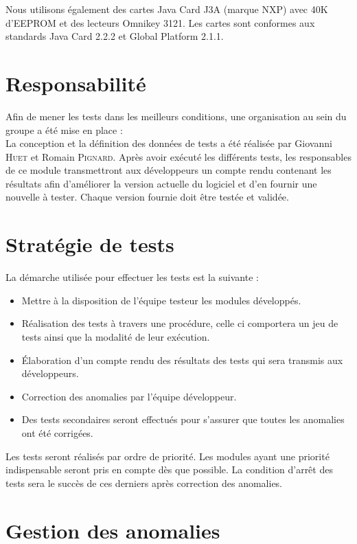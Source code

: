 \documentclass[a4paper,11pt,french]{article}
\begin{document}
Nous utilisons également des cartes Java Card J3A (marque NXP) avec 40K
d'EEPROM et des lecteurs Omnikey 3121. Les cartes sont conformes aux standards
Java Card 2.2.2 et Global Platform 2.1.1.

\section{Responsabilité}
Afin de mener les tests dans les meilleurs conditions, une organisation au sein
du groupe a été mise en place :\\

La conception et la définition des données de tests a été réalisée par
Giovanni \textsc{Huet} et Romain \textsc{Pignard}. Après avoir exécuté
les différents tests, les responsables de ce module transmettront aux
développeurs un compte rendu contenant les résultats afin d’améliorer la
version actuelle du logiciel et d'en fournir une nouvelle à tester. Chaque
version fournie doit être testée et validée.

\section{Stratégie de tests}

La démarche utilisée pour effectuer les tests est la suivante :
\begin{itemize}
\item Mettre à la disposition de l’équipe testeur les modules développés.
\item Réalisation des tests à travers une procédure, celle ci comportera
un jeu de tests ainsi que la modalité de leur exécution.
\item Élaboration d'un compte rendu des résultats des tests qui sera
transmis aux développeurs.
\item Correction des anomalies par l'équipe développeur.
\item Des tests secondaires seront effectués pour s'assurer que toutes les
anomalies ont été corrigées.
\end{itemize}

Les tests seront réalisés par ordre de priorité. Les modules ayant une
priorité indispensable seront pris en compte dès que possible. La condition
d'arrêt des tests sera le succès de ces derniers après correction des
anomalies.

\section{Gestion des anomalies}
\end{document}
